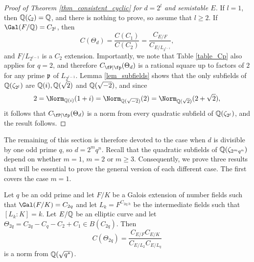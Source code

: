 \begin{proof}[Proof of Theorem \ref{thm_consistent_cyclic} for $d=2^l$ and semistable $E$]

    If $l=1$, then $\mathbb{Q}(\zeta_2)=\mathbb{Q}$, and there is nothing to prove, so assume that $l\geq2$. If $\Gal(F/\QQ)=C_{2^l}$, then 
    $$C(\Theta_d)=\frac{C(C_1)}{C(C_2)}=\frac{C_{E/F}}{C_{E/L_{2^{l-1}}}},$$
    and $F/L_{2^{l-1}}$ is a $C_2$ extension. Importantly, we note that Table \ref{table_Cp} also applies for $q=2$, and therefore $\Cp(\Theta_d)$ is a rational square up to factors of $2$ for any prime $\mathfrak{p}$ of $L_{2^{l-1}}$. Lemma \ref{lem_subfields} shows that the only subfields of $\mathbb{Q}(\zeta_{2^l})$ are $\mathbb{Q}(i),\mathbb{Q}(\sqrt{2})$ and $\mathbb{Q}(\sqrt{-2})$, and since
    $$2=\Norm_{\QQ(i)}(1+i)=\Norm_{\QQ(\sqrt{-2})}(2)=\Norm_{\QQ(\sqrt{2})}(2+\sqrt{2}),$$
    it follows that $\Cp(\Theta_d)$ is a norm from every quadratic subfield of $\mathbb{Q}(\zeta_{2^l})$, and the result follows.
\end{proof}

The remaining of this section is therefore devoted to the case when $d$ is divisible by one odd prime $q$, so $d=2^mq^n$. 
Recall that the quadratic subfields of $\mathbb{Q}(\zeta_{2^mq^n})$ depend on whether $m=1$, $m=2$ or $m\geq 3$. Consequently, we prove three results that will be essential to prove the general version of each different case. The first covers the case $m=1$.

\begin{lemma}\label{lem_C2p}
    Let $q$ be an odd prime and let $F/K$ be a Galois extension of number fields such that $\Gal(F/K)=C_{2q}$ and let $L_k=F^{C_{2q/k}}$ be the intermediate fields such that $[L_k:K]=k$. Let $E/\mathbb{Q}$ be an elliptic curve and let $\Theta_{2q}=C_{2q}-C_q-C_2+C_1\in B(C_{2q})$. Then
    $$C(\Theta_{2q})=\frac{C_{E/F}C_{E/K}}{C_{E/L_2}C_{E/L_q}}$$
    is a norm from $\mathbb{Q}(\sqrt{q^*})$.
\end{lemma}

